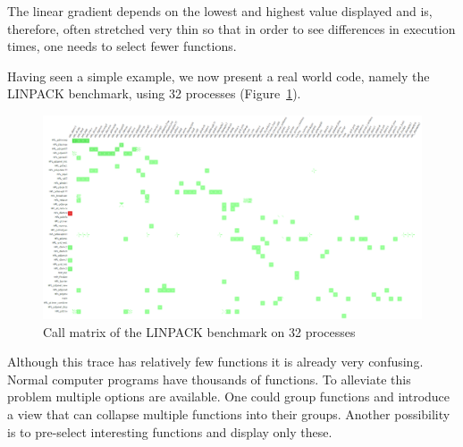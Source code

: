 \documentclass[b5paper, final, hauptseminar]{zih-template}
\begin{document}
The linear gradient depends on the lowest and highest value displayed and is, therefore, often stretched very thin so that in order to see differences in execution times, one needs to select fewer functions.

Having seen a simple example, we now present a real world code, namely the LINPACK benchmark, using 32 processes (Figure~\ref{fig:id-m-lp-1}).
\begin{figure}[htbp]
	\centering
	\includegraphics[width=0.8\linewidth]{id-m-lp-1}
	\caption{Call matrix of the LINPACK benchmark on 32 processes}
	\label{fig:id-m-lp-1}
\end{figure}
Although this trace has relatively few functions it is already very confusing.
Normal computer programs have thousands of functions.
To alleviate this problem multiple options are available.
One could group functions and introduce a view that can collapse multiple functions into their groups.
Another possibility is to pre-select interesting functions and display only these.
\end{document}
